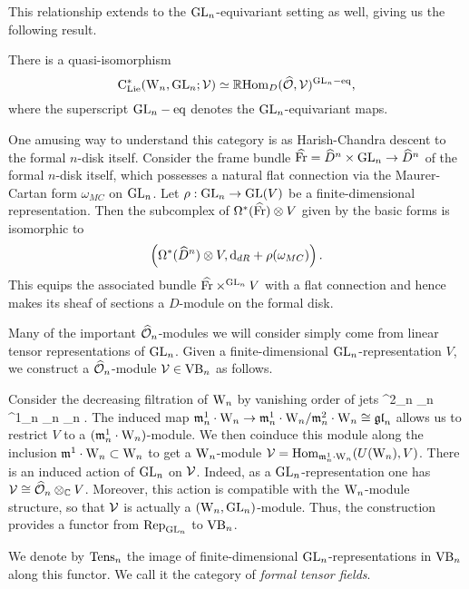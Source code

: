 This relationship extends to the ${\rm GL}_n$-equivariant setting as well, giving us the following result.

\begin{lemma}
There is a quasi-isomorphism
\[
{\rm C}_{{\rm Lie}}^*({{\rm W}_n},{\rm GL}_n; \mathcal{V}) \simeq \mathbb R {\rm Hom}_D(\widehat{\mathcal O},\mathcal{V})^{{\rm GL}_n-{\rm eq}},
\]
where the superscript ${\rm GL}_n-{\rm eq}$ denotes the ${\rm GL}_n$-equivariant maps.
\end{lemma}

\begin{rmk}
One amusing way to understand this category is as Harish-Chandra descent to the formal $n$-disk itself. 
Consider the frame bundle $\widehat{{\rm Fr}} = \widehat{D}^n \times {\rm GL}_n \to \widehat{D}^n$ of the formal $n$-disk itself, 
which possesses a natural flat connection via the Maurer-Cartan form $\omega_{MC}$ on ${\rm GL}_n$. 
Let $\rho: {\rm GL}_n \to {\rm GL}(V)$ be a finite-dimensional representation. 
Then the subcomplex of $\Omega^*(\widehat{{\rm Fr}})\otimes V$ given by the basic forms is isomorphic to
\[
\left(\Omega^*(\widehat{D}^n) \otimes V, {\rm d}_{dR} + \rho(\omega_{MC}) \right).
\]
This equips the associated bundle $\widehat{{\rm Fr}}\times^{{\rm GL}_n} V$ with a flat connection and 
hence makes its sheaf of sections a $D$-module on the formal disk.
\end{rmk}

Many of the important $\widehat{\mathcal O}_n$-modules we will consider simply come from linear tensor representations of ${\rm GL}_n$. 
Given a finite-dimensional ${\rm GL}_n$-representation $V$, we construct a $\widehat{\mathcal O}_n$-module $\mathcal{V} \in {\rm VB}_n$ as follows. 

Consider the decreasing filtration of ${{\rm W}_n}$ by vanishing order of jets 
\ben
\cdots \subset \fm^{2}_n _{n} \subset \fm^1_n _n _n .
\een 
The induced map ${\mathfrak m}_n^1 \cdot {{\rm W}_n} \to {\mathfrak m}_n^1 \cdot {{\rm W}_n} / {\mathfrak m}_n^2
\cdot {{\rm W}_n} \cong {\mathfrak{gl}}_n$ allows us to restrict $V$ to a $({\mathfrak m}_n^1 \cdot
{{\rm W}_n})$-module. 
We  then coinduce this module along the inclusion ${\mathfrak m}^1 \cdot {{\rm W}_n}
\subset {{\rm W}_n}$ to get a ${{\rm W}_n}$-module $\mathcal{V} = {\rm Hom}_{{\mathfrak m}_n^1 \cdot {{\rm W}_n}}(U({{\rm W}_n}),V)$. 
There is an induced action of ${\rm GL}_n$ on $\mathcal{V}$. Indeed, as a ${\rm GL}_n$-representation one has $\mathcal{V} \cong \widehat{\mathcal O}_n \otimes_{\mathbb C} V$.
Moreover, this action is compatible with the ${{\rm W}_n}$-module structure, so that $\mathcal{V}$ is actually a $({{\rm W}_n}, {\rm GL}_n)$-module. 
Thus, the construction provides a functor  from ${\rm Rep}_{{\rm GL}_n}$ to
${\rm VB}_n$.

\begin{dfn} 
We denote by ${\rm Tens}_n$ the image of finite-dimensional ${\rm GL}_n$-representations in ${\rm VB}_n$ along this functor. 
We call it the category of {\em formal tensor fields}.
\end{dfn}

